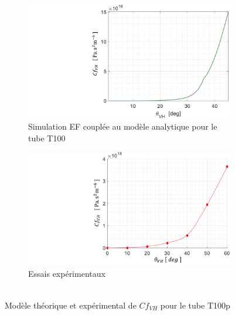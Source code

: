 \begin{figure}[!htbp]
\begin{center}
	\begin{subfigure}[h]{0.48\textwidth}
    	\captionsetup{justification=centering}
		\includegraphics[trim={10cm 0cm 0cm 0cm},clip, 					                 width=\textwidth]{../Chap5/Figure/(Cf_VH)_vs_theta_D1mm.pdf}
		\caption{Simulation EF couplée au modèle analytique pour le tube T100}
		\label{fig:theorique_Cf_VH(theta)_D1mm_comparaison}  
	\end{subfigure}
\hfillx
	\begin{subfigure}[h]{0.48\textwidth}
    	\captionsetup{justification=centering}
		\includegraphics[trim={10cm 0cm 0cm 0cm},clip, 					                 width=\textwidth]{../Chap4/Figure/resultats_essais_hydraulique_VH_D1mm.pdf}
		\caption{Essais expérimentaux\\~~}
		\label{fig:experimental_Cf_VH(theta)_D1mm_comparaison}  
	\end{subfigure}
	\caption{Modèle théorique et expérimental de $Cf_{VH}$ pour le tube T100p}
	\label{fig:Cf_comparaison_theorie_experimental}
\end{center}	
\end{figure}

